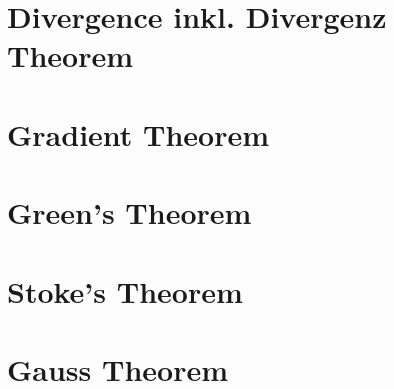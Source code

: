 \documentclass[12pt,a4paper]{article}
\begin{document}
\begin{itemize}
	\newpage
	
	\section{Divergence inkl. Divergenz Theorem}
	
	\newpage
	
	\section{Gradient Theorem}
	
	\newpage
	
	\section{Green's Theorem}
	
	\newpage
	
	\section{Stoke's Theorem}
	
	\newpage
	
	\section{Gauss Theorem}
	
	
	

	
	
	
	\end{itemize}
	
\end{document}
